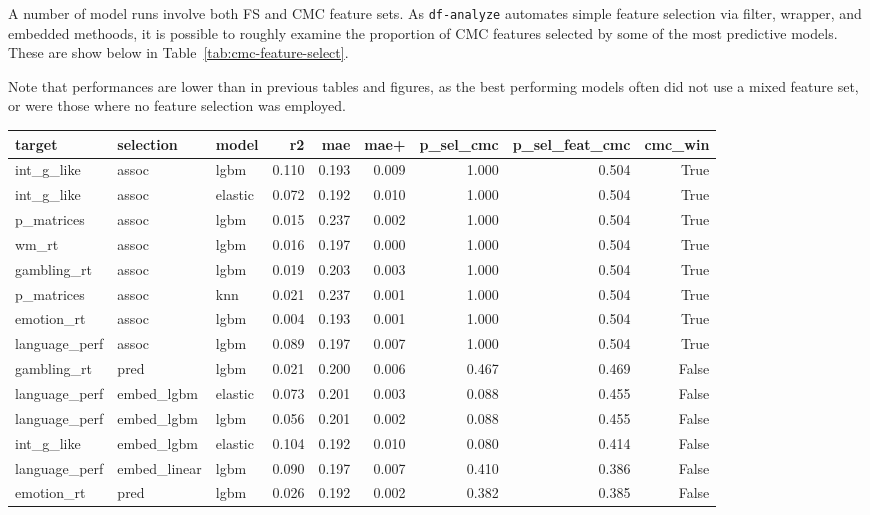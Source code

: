 \documentclass{article}
\begin{document}
A number of model runs involve both FS and CMC feature sets. As \texttt{df-analyze}
automates simple feature selection via filter, wrapper, and embedded
methoods, it is possible to roughly examine the proportion of CMC features
selected by some of the most predictive models. These are show below in
Table~\ref{tab:cmc-feature-select}.

Note that performances are lower than in previous tables and figures, as the best
performing models often did not use a mixed feature set, or were those where no
feature selection was employed.

\begin{table}
\centering
\begin{tabular}{lllrrrrrr}
	\toprule
	target & selection & model & r2 & mae & mae+ & p\_sel\_cmc & p\_sel\_feat\_cmc & cmc\_win \\
	\midrule
	int\_g\_like & assoc & lgbm & 0.110 & 0.193 & 0.009 & 1.000 & 0.504 & True \\
	int\_g\_like & assoc & elastic & 0.072 & 0.192 & 0.010 & 1.000 & 0.504 & True \\
	p\_matrices & assoc & lgbm & 0.015 & 0.237 & 0.002 & 1.000 & 0.504 & True \\
	wm\_rt & assoc & lgbm & 0.016 & 0.197 & 0.000 & 1.000 & 0.504 & True \\
	gambling\_rt & assoc & lgbm & 0.019 & 0.203 & 0.003 & 1.000 & 0.504 & True \\
	p\_matrices & assoc & knn & 0.021 & 0.237 & 0.001 & 1.000 & 0.504 & True \\
	emotion\_rt & assoc & lgbm & 0.004 & 0.193 & 0.001 & 1.000 & 0.504 & True \\
	language\_perf & assoc & lgbm & 0.089 & 0.197 & 0.007 & 1.000 & 0.504 & True \\
	gambling\_rt & pred & lgbm & 0.021 & 0.200 & 0.006 & 0.467 & 0.469 & False \\
	language\_perf & embed\_lgbm & elastic & 0.073 & 0.201 & 0.003 & 0.088 & 0.455 & False \\
	language\_perf & embed\_lgbm & lgbm & 0.056 & 0.201 & 0.002 & 0.088 & 0.455 & False \\
	int\_g\_like & embed\_lgbm & elastic & 0.104 & 0.192 & 0.010 & 0.080 & 0.414 & False \\
	language\_perf & embed\_linear & lgbm & 0.090 & 0.197 & 0.007 & 0.410 & 0.386 & False \\
	emotion\_rt & pred & lgbm & 0.026 & 0.192 & 0.002 & 0.382 & 0.385 & False \\

\end{tabular}
\end{table}
\end{document}
